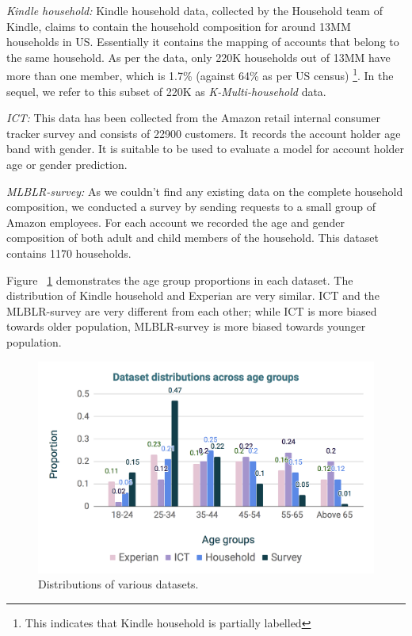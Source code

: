\textit{Kindle household: } Kindle household data, collected by the Household team of Kindle, claims to contain the household composition for around 13MM households in US. Essentially it contains the mapping of accounts that belong to the same household. As per the data, only 220K households out of 13MM have more than one member, which is 1.7\% (against 64\% as per US census) \footnote{This indicates that Kindle household is partially labelled}. In the sequel, we refer to this subset of 220K as \textit{K-Multi-household} data.

%
\textit{ICT:} This data has been collected from the Amazon retail internal consumer tracker survey and consists of 22900 customers. It records the account holder age band with gender. It is suitable to be used  to evaluate a model for account holder age or gender prediction. 

\textit{MLBLR-survey:} As we couldn't find any existing data on the complete household composition, we conducted a survey by sending requests to a small group of Amazon employees. For each account we recorded the age and gender composition of both adult and child members of the household. This dataset contains 1170 households.

Figure ~\ref{fig:datasets} demonstrates the age group proportions in each dataset. The distribution of Kindle household and Experian are very similar. ICT and the MLBLR-survey are very different from each other; while ICT is more biased towards older population, MLBLR-survey is more biased towards younger population.
%
%
\begin{figure}
\setlength{\belowcaptionskip}{-10pt}
  \centering
    \includegraphics[width=0.99\linewidth]{datasetDistributions3.png}
  \caption{Distributions of various datasets. }
  \label{fig:datasets}
\end{figure}
%

